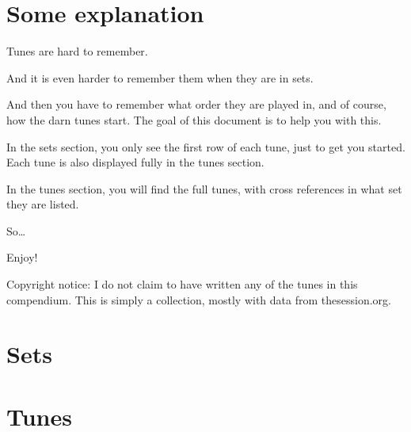 \documentclass[10pt]{book}
\begin{document}

\setcounter{tocdepth}{3}
\tableofcontents
{}
\clearpage

\setcounter{page}{1}
\chapter*{Some explanation}
Tunes are hard to remember.

And it is even harder to remember them when they are in sets.

And then you have to remember what order they are played in, and of course, how the darn tunes start. The goal of this document is to help you with this.

In the sets section, you only see the first row of each tune, just to get you started. Each tune is also displayed fully in the tunes section.

In the tunes section, you will find the full tunes, with cross references in what set they are listed.

So\ldots

Enjoy!

Copyright notice: I do not claim to have written any of the tunes in this compendium. This is simply a collection, mostly with data from thesession.org. 

\chapter{Sets}

\clearpage

\clearpage

\clearpage

\clearpage

\clearpage

\clearpage

\chapter{Tunes}

\clearpage

\clearpage

\clearpage

\clearpage

\clearpage

\printindex
\end{document}
